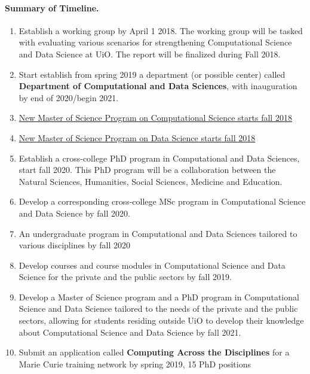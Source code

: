 \documentclass[%
oneside,                 %
final,                   %
10pt]{article}
\begin{document}
\noindent
\paragraph{Summary of Timeline.}
\begin{enumerate}
\item Establish a working group by April 1 2018. The working group will be tasked with evaluating various scenarios for strengthening Computational Science and Data Science at UiO. The report will be finalized during Fall 2018.

\item Start establish from spring 2019 a department (or possible center)  called \textbf{Department of Computational and Data Sciences}, with inauguration by end of 2020/begin 2021. 

\item \href{{http://www.uio.no/english/studies/programmes/computational-science-master/index.html}}{New Master of Science Program on Computational Science starts fall 2018}

\item \href{{http://www.uio.no/english/studies/programmes/datascience-master/index.html}}{New Master of Science Program on Data Science starts fall 2018}

\item Establish  a cross-college PhD program in Computational and Data Sciences, start fall 2020. This PhD program will be a collaboration between the Natural Sciences, Humanities, Social Sciences, Medicine and Education. 

\item Develop a corresponding cross-college MSc program in Computational Science and Data Science by fall 2020.

\item An undergraduate program in Computational and Data Sciences tailored to various disciplines by fall 2020

\item Develop courses and course modules in Computational Science and Data Science for the private and the public sectors by fall 2019.

\item Develop a Master of Science program and a PhD program in Computational Science and Data Science tailored to the needs of the private and the public sectors, allowing for students residing outside UiO to develop their knowledge about Computational Science and Data Science by fall 2021.

\item Submit an application called \textbf{Computing Across the Disciplines} for a Marie Curie training network by spring 2019, 15 PhD positions
\end{enumerate}
\end{document}
